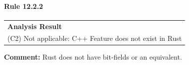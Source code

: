 \paragraph{Rule 12.2.2}
\begin{longtable}{p{13cm}}
\textbf{Analysis Result} \\
(C2) Not applicable: C++ Feature does not exist in Rust \\
\end{longtable}
\textbf{Comment:} Rust does not have bit-fields or an equivalent. \\
